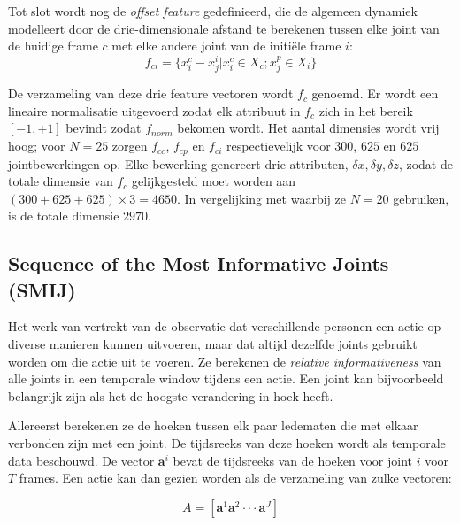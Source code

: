 Tot slot wordt nog de \textit{offset feature} gedefinieerd, die de algemeen dynamiek modelleert door de drie-dimensionale afstand te berekenen tussen elke joint van de huidige frame $c$ met elke andere joint van de initiële frame $i$:
$$f_{ci} = \{x_i^c - x_j^i |  x_i^c \in X_c ; x_j^p \in X_i \}$$

De verzameling van deze drie feature vectoren wordt $f_c$ genoemd. Er wordt een lineaire normalisatie uitgevoerd zodat elk attribuut in $f_c$ zich in het bereik $[-1, +1]$ bevindt zodat $f_{norm}$ bekomen wordt. Het aantal dimensies wordt vrij hoog; voor $N = 25$ zorgen $f_{cc}$, $f_{cp}$ en $f_{ci}$ respectievelijk voor $300$, $625$ en $625$ jointbewerkingen op. Elke bewerking genereert drie attributen, $\delta x, \delta y, \delta z$, zodat de totale dimensie van $f_c$ gelijkgesteld moet worden aan $ (300 + 625 + 625) \times 3 = 4650$. In vergelijking met \cite{Yang2012} waarbij ze $N = 20$ gebruiken, is de totale dimensie $2970$.


\subsection{Sequence of the Most Informative Joints (SMIJ)}
Het werk van \cite{Ofli2012} vertrekt van de observatie dat verschillende personen een actie op diverse manieren kunnen uitvoeren, maar dat altijd dezelfde joints gebruikt worden om die actie uit te voeren. Ze berekenen de \textit{relative informativeness} van alle joints in een temporale window tijdens een actie. Een joint kan bijvoorbeeld belangrijk zijn als het de hoogste verandering in hoek heeft. 

Allereerst berekenen ze de hoeken tussen elk paar ledematen die met elkaar verbonden zijn met een joint. De tijdsreeks van deze hoeken wordt als temporale data beschouwd. De vector $\textbf{a}^i$ bevat de tijdsreeks van de hoeken voor joint $i$ voor $T$ frames. Een actie kan dan gezien worden als de verzameling van zulke vectoren:

$$A = [\textbf{a}^1\textbf{a}^2 \cdot\cdot\cdot \textbf{a}^J]$$

